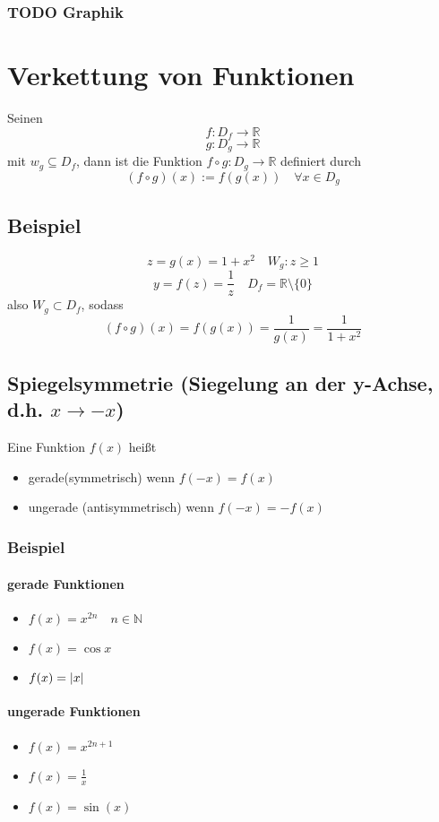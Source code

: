 \documentclass[a4paper]{scrartcl}
\DeclarePairedDelimiter\abs{\lvert}{\rvert}%
\DeclareMathOperator{\Forall}{\forall}
\begin{document}
\subsubsection{{\bfseries\sffamily TODO} Graphik}
\label{sec-6-3-1}
\section{Verkettung von Funktionen}
\label{sec-7}
Seinen \[f:D_f \to \mathbb{R}\] \[g:D_g\to\mathbb{R}\] mit $w_g \subseteq D_f$, dann ist die Funktion $f\circ g: D_g\to\mathbb{R}$ definiert durch \[(f\circ g)(x):=f(g(x))\quad\Forall x\in D_g\]
\subsection{Beispiel}
\label{sec-7-1}
\[z = g(x) = 1+x^2\quad W_g: z\geq 1\]
\[y=f(z)=\frac{1}{z}\quad D_f=\mathbb{R}\setminus\{0\}\]
also $W_g\subset D_f$, sodass \[(f\circ g)(x)=f(g(x)) = \frac{1}{g(x)}= \frac{1}{1+x^2}\]
\subsection{Spiegelsymmetrie (Siegelung an der y-Achse, d.h. $x\to -x$)}
\label{sec-7-2}
Eine Funktion $f(x)$ heißt
\begin{itemize}
\item gerade(symmetrisch) wenn $f(-x) = f(x)$
\item ungerade (antisymmetrisch) wenn $f(-x) = -f(x)$
\end{itemize}
\subsubsection{Beispiel}
\label{sec-7-2-1}
\paragraph{gerade Funktionen}
\label{sec-7-2-1-1}
\begin{itemize}
\item $f(x) = x^{2n}\quad n\in\mathbb{N}$
\item $f(x) = \cos{x}$
\item $f(x) = \abs{x}$
\end{itemize}
\paragraph{ungerade Funktionen}
\label{sec-7-2-1-2}
\begin{itemize}
\item $f(x) = x^{2n + 1}$
\item $f(x)=\frac{1}{x}$
\item $f(x)=\sin(x)$
\end{itemize}
\end{document}
